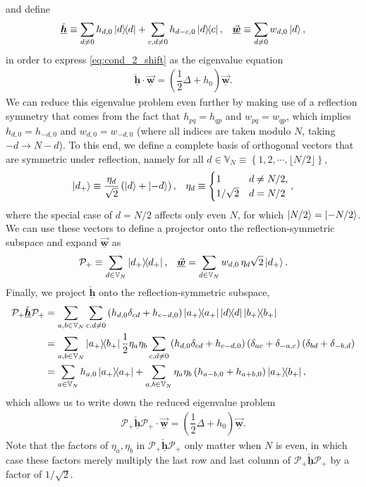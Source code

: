 \documentclass[nofootinbib,notitlepage,11pt]{revtex4-2}
\newcommand{\f}[2]{\dfrac{#1}{#2}} %
\newcommand{\p}[1]{\left(#1\right)} %
\renewcommand{\set}[1]{\left\{#1\right\}} %
\renewcommand{\c}{\cdot} %
\newcommand{\m}{\bm} %
\renewcommand{\v}{\vec} %
\newcommand{\1}{\mathds{1}}
\renewcommand{\P}{\mathcal{P}}
\newcommand{\VV}{\mathbb{V}}
\newcommand{\ul}{\underline}
\newcommand{\floor}[1]{\lfloor{#1}\rfloor}
\begin{document}
and define
\begin{align}
  \ul{\check{\m h}}
  \equiv \sum_{d\ne0} h_{d,0} \op{d}
  + \sum_{c,d\ne0} h_{d-c,0} \op{d}{c},
  &&
  \ul{\v{\m w}} \equiv \sum_{d\ne0} w_{d,0} \ket{d},
\end{align}
in order to express \eqref{eq:cond_2_shift} as the eigenvalue
equation
\begin{align}
  \ul{\check{\m h}} \c \ul{\v{\m w}}
  = \p{\f12\Delta + h_0} \ul{\v{\m w}}.
  \label{eq:cond_2_square}
\end{align}
We can reduce this eigenvalue problem even further by making use of a
reflection symmetry that comes from the fact that $h_{pq}=h_{qp}$ and
$w_{pq}=w_{qp}$, which implies $h_{d,0}=h_{-d,0}$ and
$w_{d,0}=w_{-d,0}$ (where all indices are taken modulo $N$, taking
$-d\to N-d$).  To this end, we define a complete basis of orthogonal
vectors that are symmetric under reflection, namely for all
$d\in\VV_N\equiv\set{1,2,\cdots,\floor{N/2}}$,
\begin{align}
  \ket{d_+} \equiv \f{\eta_d}{\sqrt{2}}\p{\ket{d} + \ket{-d}},
  && \eta_d \equiv
  \begin{cases}
    1 & d \ne N/2, \\
    1/\sqrt{2} & d = N/2
  \end{cases},
\end{align}
where the special case of $d=N/2$ affects only even $N$, for which
$\ket{N/2}=\ket{-N/2}$.  We can use these vectors to define a
projector onto the reflection-symmetric subspace and expand
$\ul{\v{\m w}}$ as
\begin{align}
  \P_+ \equiv \sum_{d\in\VV_N} \op{d_+},
  &&
  \ul{\v{\m w}} = \sum_{d\in\VV_N} w_{d,0} \,
  \eta_d \sqrt{2} \ket{d_+}.
\end{align}
Finally, we project $\ul{\check{\m h}}$ onto the reflection-symmetric
subspace,
\begin{align}
  \P_+ \ul{\check{\m h}} \P_+
  &= \sum_{a,b\in\VV_N} \sum_{c,d\ne0}
  \p{h_{d,0} \delta_{cd} + h_{c-d,0}} \op{a_+} \op{d} \op{b_+} \\
  &= \sum_{a,b\in\VV_N} \op{a_+}{b_+} \f12 \eta_a\eta_b
  \sum_{c,d\ne0} \p{h_{d,0} \delta_{cd} + h_{c-d,0}}
  \p{\delta_{ac} + \delta_{-a,c}} \p{\delta_{bd} + \delta_{-b,d}} \\
  &= \sum_{a\in\VV_N} h_{a,0} \op{a_+}
  + \sum_{a,b\in\VV_N} \eta_a\eta_b
  \p{h_{a-b,0} + h_{a+b,0}} \op{a_+}{b_+},
\end{align}
which allows us to write down the reduced eigenvalue problem
\begin{align}
  \P_+ \ul{\check{\m h}} \P_+ \c \ul{\v{\m w}}
  = \p{\f12\Delta + h_0} \ul{\v{\m w}}.
\end{align}
Note that the factors of $\eta_a,\eta_b$ in
$\P_+ \ul{\check{\m h}} \P_+$ only matter when $N$ is even, in which
case these factors merely multiply the last row and last column of
$\P_+ \ul{\check{\m h}} \P_+$ by a factor of $1/\sqrt{2}$.
\end{document}
